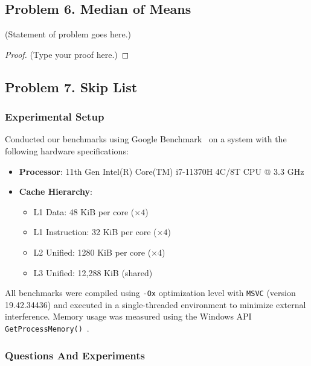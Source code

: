 \documentclass[12pt]{article}
\begin{document}
	\vspace{2in} %
	
	
	\subsection*{Problem 6. Median of Means}
	(Statement of problem goes here.)\\
	
	\begin{proof}
		(Type your proof here.)
	\end{proof}
	
	\vspace{2in} %
	
	
	\subsection*{Problem 7. Skip List}
	\vspace{20pt}
	\subsubsection*{Experimental Setup}
	Conducted our benchmarks using Google Benchmark~\cite{google-bench} on a system with the following hardware specifications:

\begin{itemize}
	\small
    \item \textbf{Processor}: 11th Gen Intel(R) Core(TM) i7-11370H 4C/8T CPU @ 3.3 GHz
    \item \textbf{Cache Hierarchy}:
    \begin{itemize}
        \item L1 Data: 48 KiB per core (\(\times 4\))
        \item L1 Instruction: 32 KiB per core (\(\times 4\))
        \item L2 Unified: 1280 KiB per core (\(\times 4\))
        \item L3 Unified: 12,288 KiB (shared)
    \end{itemize}
\end{itemize}

All benchmarks were compiled using \texttt{-Ox} optimization level with \texttt{MSVC} (version 19.42.34436) and executed in a single-threaded environment to minimize external interference. Memory usage was measured using the Windows API \texttt{GetProcessMemory()}~\cite{getprocessmemoryinfo}.\\

\subsubsection*{Questions And Experiments}
	
\end{document}
